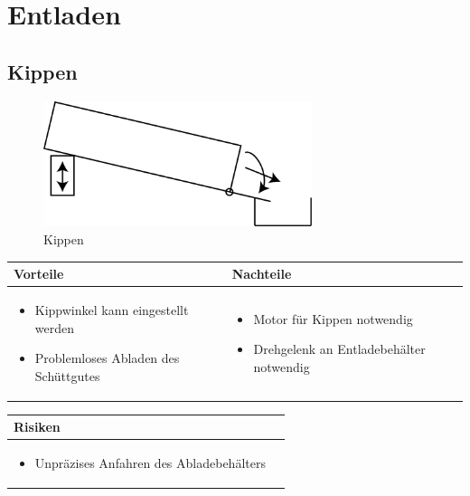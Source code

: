 
\section{Entladen}


\subsection{Kippen}
\begin{figure} [hbp]
	\centering
	\includegraphics[width=0.7\textwidth]{fig/Entladen_Kippen.png}
	\caption{Kippen}
\end{figure}

\begin{table}[h]
\begin{tabular}{p{} | p{}}


 \textbf{Vorteile} & \textbf{Nachteile} \\ \hline
	 
\begin{itemize}
\item Kippwinkel kann eingestellt werden
\item Problemloses Abladen des Schüttgutes
\end{itemize}

 
 &
 
\begin{itemize}
\item Motor für Kippen notwendig
\item Drehgelenk an Entladebehälter notwendig
\end{itemize}

\end{tabular}
\end{table}

\begin{table}[h]
\begin{tabular}{p{}p{}}


 \textbf{Risiken} & \\ \hline
	 
\begin{itemize}
\item Unpräzises Anfahren des Abladebehälters
\end{itemize}

 
\end{tabular}
\end{table}

